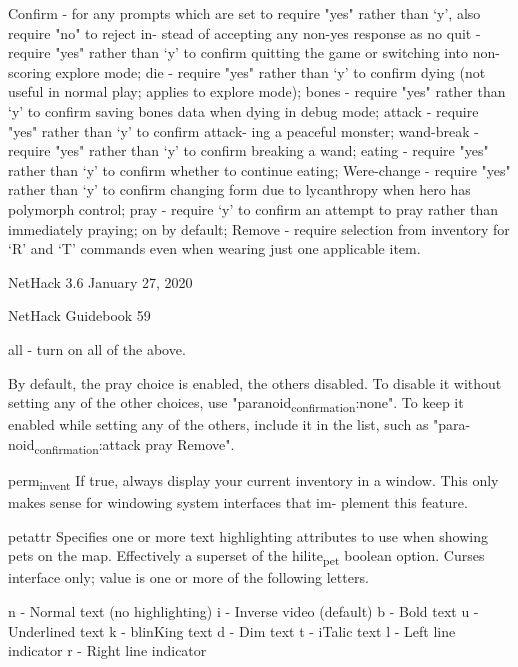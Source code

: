 \documentclass[11pt]{article}
\begin{document}
Confirm   - for any prompts which are set to require "yes"
       rather than `y', also require "no" to reject in-
       stead of accepting any non-yes response as no
quit    - require "yes" rather than `y' to confirm quitting
       the game or switching into non-scoring explore
       mode;
die     - require "yes" rather than `y' to confirm dying
       (not useful in normal play; applies to explore
       mode);
bones    - require "yes" rather than `y' to confirm saving
       bones data when dying in debug mode;
attack   - require "yes" rather than `y' to confirm attack-
       ing a peaceful monster;
wand-break - require "yes" rather than `y' to confirm breaking
       a wand;
eating   - require "yes" rather than `y' to confirm whether
       to continue eating;
Were-change - require "yes" rather than `y' to confirm changing
       form due to lycanthropy when hero has polymorph
       control;
pray    - require `y' to confirm an attempt to pray rather
       than immediately praying; on by default;
Remove   - require selection from inventory for `R' and `T'
       commands even when wearing just one applicable
       item.


NetHack 3.6                   January 27, 2020





NetHack Guidebook                       59



all     - turn on all of the above.

By default, the pray choice is enabled, the others disabled.
To disable it without setting any of the other choices, use
"paranoid\textsubscript{confirmation}:none". To keep it enabled while setting
any of the others, include it in the list, such as "para-
noid\textsubscript{confirmation}:attack pray Remove".

perm\textsubscript{invent}
 If true, always display your current inventory in a window.
 This only makes sense for windowing system interfaces that im-
 plement this feature.

petattr
 Specifies one or more text highlighting attributes to use when
 showing pets on the map.  Effectively a superset of the
 hilite\textsubscript{pet} boolean option. Curses interface only; value is one
 or more of the following letters.

n - Normal text (no highlighting)
i - Inverse video (default)
b - Bold text
u - Underlined text
k - blinKing text
d - Dim text
t - iTalic text
l - Left line indicator
r - Right line indicator
\end{document}
